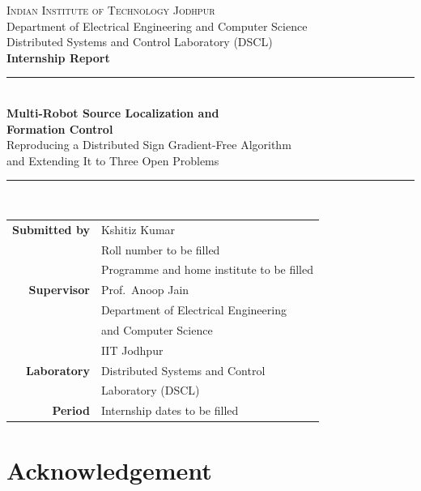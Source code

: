\documentclass[11pt,a4paper]{article}
\newcommand{\studentname}{Kshitiz Kumar}
\newcommand{\studentid}{Roll number to be filled}
\newcommand{\studentprogram}{Programme and home institute to be filled}
\newcommand{\internperiod}{Internship dates to be filled}
\begin{document}
\begin{titlepage}
\centering
\vspace*{0.6cm}

{\large\scshape Indian Institute of Technology Jodhpur}\\[0.4cm]
{\large Department of Electrical Engineering and Computer Science}\\[0.3cm]
{\large Distributed Systems and Control Laboratory (DSCL)}\\[2.2cm]

{\Large\bfseries Internship Report}\\[1.2cm]

\rule{\textwidth}{0.8pt}\\[0.5cm]
{\LARGE\bfseries Multi-Robot Source Localization and\\[0.3cm]
Formation Control}\\[0.5cm]
{\large Reproducing a Distributed Sign Gradient-Free Algorithm\\
and Extending It to Three Open Problems}\\[0.4cm]
\rule{\textwidth}{0.8pt}\\[2.2cm]

\begin{tabular}{rl}
\textbf{Submitted by} & \studentname\\
                      & \studentid\\
                      & \studentprogram\\[0.6cm]
\textbf{Supervisor}   & Prof.\ Anoop Jain\\
                      & Department of Electrical Engineering\\
                      & and Computer Science\\
                      & IIT Jodhpur\\[0.6cm]
\textbf{Laboratory}   & Distributed Systems and Control\\
                      & Laboratory (DSCL)\\[0.6cm]
\textbf{Period}       & \internperiod\\
\end{tabular}

\vfill
\end{titlepage}

\section*{Acknowledgement}
\end{document}

